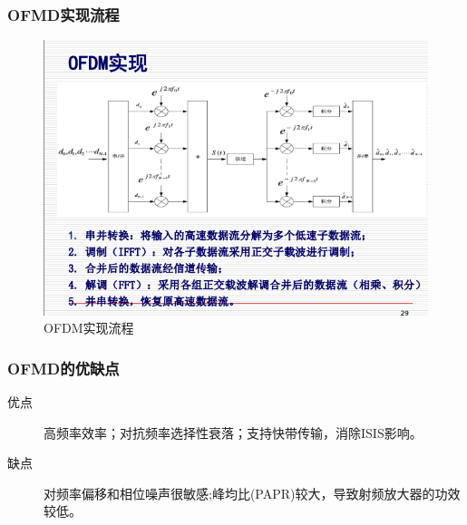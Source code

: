 \documentclass{article}
\begin{document}
	\subsubsection{OFMD实现流程}
	\begin{figure}[H]
		\centering
		\includegraphics[width=\linewidth]{OFDM实现流程}
		\caption{OFDM实现流程}
		\label{fig:ofdm}
	\end{figure}
	\subsubsection{OFMD的优缺点}
	\begin{description}
		\item[优点] 高频率效率；对抗频率选择性衰落；支持快带传输，消除ISIS影响。
		\item[缺点] 对频率偏移和相位噪声很敏感;峰均比(PAPR)较大，导致射频放大器的功效较低。
	\end{description}
\end{document}
